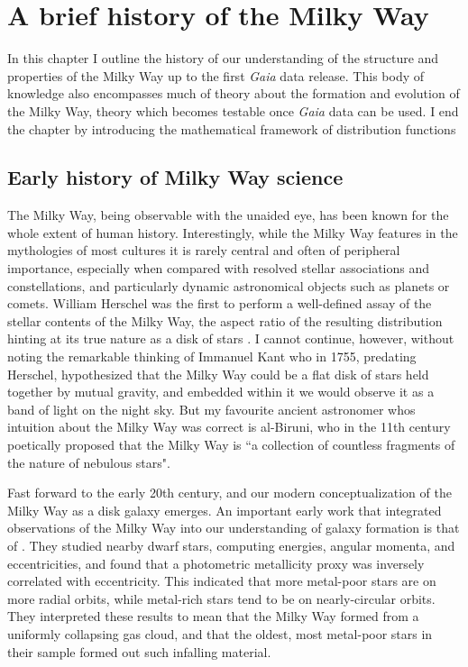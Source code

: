 
\section{A brief history of the Milky Way}

In this chapter I outline the history of our understanding of the structure and properties of the Milky Way up to the first \textit{Gaia} data release. This body of knowledge also encompasses much of theory about the formation and evolution of the Milky Way, theory which becomes testable once \textit{Gaia} data can be used. I end the chapter by introducing the mathematical framework of distribution functions 

\subsection{Early history of Milky Way science}

The Milky Way, being observable with the unaided eye, has been known for the whole extent of human history. Interestingly, while the Milky Way features in the mythologies of most cultures it is rarely central and often of peripheral importance, especially when compared with resolved stellar associations and constellations, and particularly dynamic astronomical objects such as planets or comets. William Herschel was the first to perform a well-defined assay of the stellar contents of the Milky Way, the aspect ratio of the resulting distribution hinting at its true nature as a disk of stars \parencite{herschel1785}. I cannot continue, however, without noting the remarkable thinking of Immanuel Kant who in 1755, predating Herschel, hypothesized that the Milky Way could be a flat disk of stars held together by mutual gravity, and embedded within it we would observe it as a band of light on the night sky. But my favourite ancient astronomer whos intuition about the Milky Way was correct is al-Biruni, who in the 11th century poetically proposed that the Milky Way is ``a collection of countless fragments of the nature of nebulous stars".

Fast forward to the early 20th century, and our modern conceptualization of the Milky Way as a disk galaxy emerges. An important early work that integrated observations of the Milky Way into our understanding of galaxy formation is that of \textcite{eggen62}. They studied nearby dwarf stars, computing energies, angular momenta, and eccentricities, and found that a photometric metallicity proxy was inversely correlated with eccentricity. This indicated that more metal-poor stars are on more radial orbits, while metal-rich stars tend to be on nearly-circular orbits. They interpreted these results to mean that the Milky Way formed from a uniformly collapsing gas cloud, and that the oldest, most metal-poor stars in their sample formed out such infalling material.

